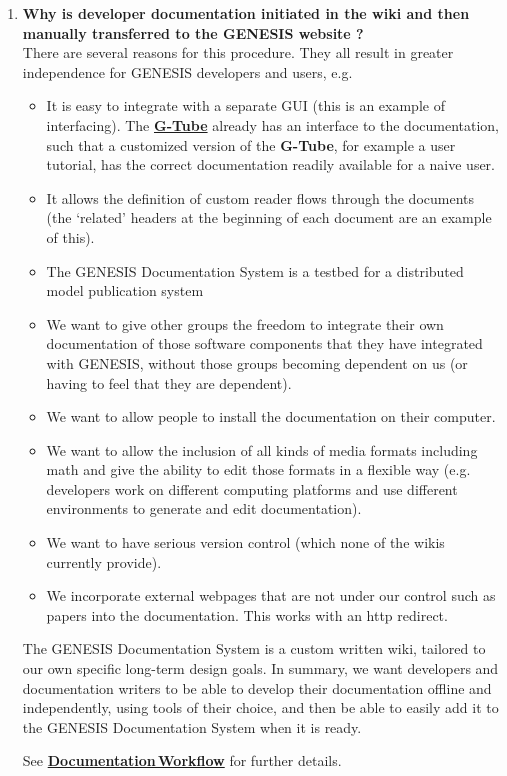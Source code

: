 \documentclass[12pt]{article}
\begin{document}
\begin{enumerate}

\item {\bf Why is developer documentation initiated in the wiki and then manually transferred to the GENESIS website ?} \\
There are several reasons for this procedure. They all result in greater independence for GENESIS developers and users, e.g.

\begin{itemize}
\item It is easy to integrate with a separate GUI (this is an example of
interfacing).  The \href{../gtube/gtube.tex}{\bf G-Tube} already has an interface to the
documentation, such that a customized version of the {\bf G-Tube}, for example a
user tutorial, has the correct documentation readily available for a
naive user.

\item It allows the definition of custom reader flows through the
documents (the `related' headers at the beginning of each document are an
example of this).

\item The GENESIS Documentation System is a testbed for a distributed model publication system

\item We want to give other groups the freedom to integrate their own
documentation of those software components that they have integrated
with GENESIS, without those groups becoming dependent on us (or having
to feel that they are dependent).

\item We want to allow people to install the documentation on their computer.

\item We want to allow the inclusion of all kinds of media formats
including math and give the ability to edit those formats in a
flexible way (e.g. developers work on different computing platforms and use different
environments to generate and edit documentation).

\item We want to have serious version control (which none of the wikis
currently provide).

\item We incorporate external webpages that are not under our control
  such as papers into the documentation.  This works with an http
  redirect.

\end{itemize}

The GENESIS Documentation System is a custom written wiki, tailored to
our own specific long-term design goals.  In summary, we want
developers and documentation writers to be able to develop their
documentation offline and independently, using tools of their choice,
and then be able to easily add it to the GENESIS Documentation System
when it is ready.

See \href{../workflow-documentation/workflow-documentation.tex}{\bf Documentation\,Workflow} for further details.

\end{enumerate}
\end{document}
